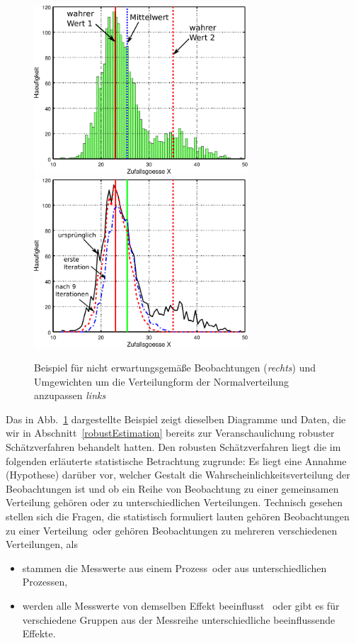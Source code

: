 \begin{figure}
\begin{center}
\includegraphics[width=80mm]{05_vorlesung/media/learn_robust.pdf}
\includegraphics[width=80mm]{05_vorlesung/media/learn_robust_2.pdf}
\caption{Beispiel für nicht erwartungsgemäße Beobachtungen (\textsl{rechts}) und
Umgewichten um die Verteilungform der Normalverteilung anzupassen \textsl{links}}
\label{biasExample}
\end{center}
\end{figure}
Das in Abb.~\ref{biasExample} dargestellte Beispiel zeigt dieselben Diagramme und
Daten, die wir in Abschnitt~\ref{robustEstimation} bereits zur Veranschaulichung
robuster Schätzverfahren behandelt hatten. Den robusten Schätzverfahren liegt die
im folgenden erläuterte statistische Betrachtung zugrunde: Es liegt eine Annahme
(Hypothese) darüber vor, welcher Gestalt die Wahrscheinlichkeitsverteilung der
Beobachtungen ist und ob ein Reihe von Beobachtung zu einer gemeinsamen Verteilung
gehören oder zu unterschiedlichen Verteilungen. Technisch gesehen stellen sich die
Fragen, die statistisch formuliert lauten \glqq gehören Beobachtungen zu einer 
Verteilung\grqq ~oder \glqq gehören Beobachtungen zu mehreren verschiedenen Verteilungen\grqq,
als 
\begin{itemize}
\item \glqq stammen die Messwerte aus einem Prozess\grqq ~oder \glqq aus unterschiedlichen
Prozessen\grqq, 
\item \glqq werden alle Messwerte von demselben Effekt beeinflusst \grqq ~oder \glqq gibt es
für verschiedene Gruppen aus der Messreihe unterschiedliche beeinflussende Effekte\grqq.
\end{itemize}
